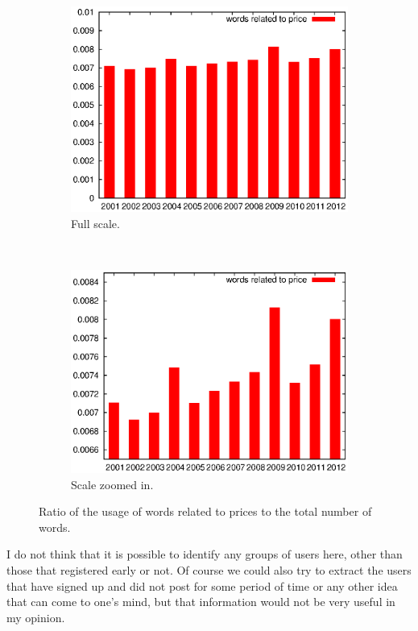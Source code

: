     \begin{figure}[H]
      \centering
      \begin{subfigure}[H]{0.7\textwidth}
        \includegraphics[width=\textwidth]{chapters/03_implementation/yearly_price1}
        \caption{Full scale.}
        \label{fig:dist_price_year_1}
      \end{subfigure}
      \\
      \begin{subfigure}[H]{0.7\textwidth}
        \includegraphics[width=\textwidth]{chapters/03_implementation/yearly_price2}
        \caption{Scale zoomed in.}
        \label{fig:dist_price_year_2}
      \end{subfigure}
      \caption{Ratio of the usage of words related to prices to the total number of words.}
      \label{fig:dist_price_year}
    \end{figure}
    I do not think that it is possible to identify any groups of users here, other than those that registered early or not. Of course we could also try to extract the users that have signed up and did not post for some period of time or any other idea that can come to one's mind, but that information would not be very useful in my opinion.
    
